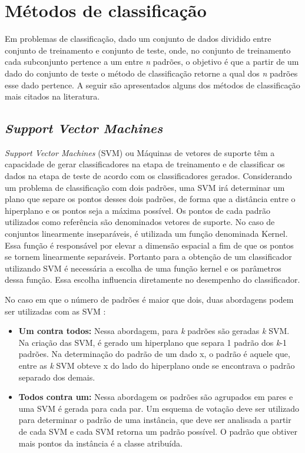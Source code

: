 \section{Métodos de classificação}
Em problemas de classificação, dado um conjunto de dados dividido entre conjunto de treinamento e conjunto de teste, onde, no conjunto de treinamento cada subconjunto pertence a um entre \textit{n} padrões, o objetivo é que a partir de um dado do conjunto de teste o método de classificação retorne a qual dos \textit{n} padrões esse dado pertence. A seguir são apresentados alguns dos métodos de classificação mais citados na literatura. 

\subsection{\it Support Vector Machines}
\textit{Support Vector Machines} (SVM) ou Máquinas de vetores de suporte têm a capacidade de gerar classificadores na etapa de treinamento e de classificar os dados na etapa de teste de acordo com os classificadores gerados. Considerando um problema de classificação com dois padrões, uma SVM irá determinar um plano que separe os pontos desses dois padrões, de forma que a distância entre o hiperplano e os pontos seja a máxima possível. Os pontos de cada padrão utilizados como referência são denominados vetores de suporte.
No caso de conjuntos linearmente inseparáveis, é utilizada um função denominada Kernel. Essa função é responsável por elevar a dimensão espacial a fim de que os pontos se tornem linearmente separáveis. Portanto para a obtenção de um classificador utilizando SVM é necessária a escolha de uma função kernel e os parâmetros dessa função. Essa escolha influencia diretamente no desempenho do classificador\cite{Gunn98SVM}\cite{Reffson02SVM}.

No caso em que o número de padrões é maior que dois, duas abordagens podem ser utilizadas com as SVM \cite{Lorena03SVM}:
\begin{itemize}
\item{\textbf{Um contra todos:} }Nessa abordagem, para \textit{k} padrões são geradas \textit{k} SVM. Na criação das SVM, é gerado um hiperplano que separa 1 padrão dos \textit{k}-1 padrões. Na determinação do padrão de um dado x, o padrão é aquele que, entre as \textit{k} SVM obteve x do lado do hiperplano onde se encontrava o padrão separado dos demais.  
\item{\textbf{Todos contra um:} }Nessa abordagem os padrões são agrupados em pares e uma SVM é gerada para cada par. Um esquema de votação deve ser utilizado para determinar o padrão de uma instância, que deve ser analisada a partir de cada SVM e cada SVM retorna um padrão possível. O padrão que obtiver mais pontos da instância é a classe atribuída.
\end{itemize}

